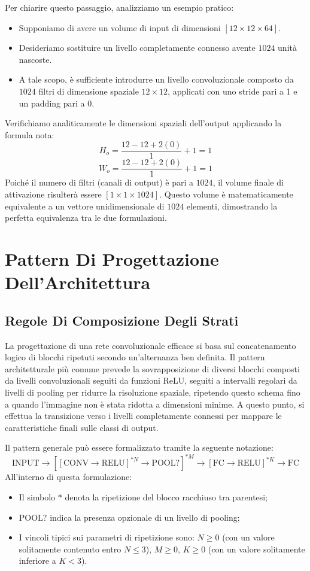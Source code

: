 ﻿\documentclass[11pt, a4paper]{article}
\begin{document}
Per chiarire questo passaggio, analizziamo un esempio pratico:
\begin{itemize}
    \item Supponiamo di avere un volume di input di dimensioni $[12 \times 12 \times 64]$.
    \item Desideriamo sostituire un livello completamente connesso avente $1024$ unità nascoste.
    \item A tale scopo, è sufficiente introdurre un livello convoluzionale composto da $1024$ filtri di dimensione spaziale $12 \times 12$, applicati con uno stride pari a 1 e un padding pari a 0.
\end{itemize}
Verifichiamo analiticamente le dimensioni spaziali dell'output applicando la formula nota:
\[
H_o = \frac{12 - 12 + 2(0)}{1} + 1 = 1
\]
\[
W_o = \frac{12 - 12 + 2(0)}{1} + 1 = 1
\]
Poiché il numero di filtri (canali di output) è pari a $1024$, il volume finale di attivazione risulterà essere $[1 \times 1 \times 1024]$. Questo volume è matematicamente equivalente a un vettore unidimensionale di $1024$ elementi, dimostrando la perfetta equivalenza tra le due formulazioni.

\newpage

\section{Pattern Di Progettazione Dell'Architettura}

\subsection{Regole Di Composizione Degli Strati}

La progettazione di una rete convoluzionale efficace si basa sul concatenamento logico di blocchi ripetuti secondo un'alternanza ben definita. Il pattern architetturale più comune prevede la sovrapposizione di diversi blocchi composti da livelli convoluzionali seguiti da funzioni ReLU, seguiti a intervalli regolari da livelli di pooling per ridurre la risoluzione spaziale, ripetendo questo schema fino a quando l'immagine non è stata ridotta a dimensioni minime. A questo punto, si effettua la transizione verso i livelli completamente connessi per mappare le caratteristiche finali sulle classi di output.

Il pattern generale può essere formalizzato tramite la seguente notazione:
\[
\boxed{\text{INPUT} \rightarrow [[\text{CONV} \rightarrow \text{RELU}]^{*N} \rightarrow \text{POOL?}]^{*M} \rightarrow [\text{FC} \rightarrow \text{RELU}]^{*K} \rightarrow \text{FC}}
\]
All'interno di questa formulazione:
\begin{itemize}
    \item Il simbolo $*$ denota la ripetizione del blocco racchiuso tra parentesi;
    \item $\text{POOL?}$ indica la presenza opzionale di un livello di pooling;
    \item I vincoli tipici sui parametri di ripetizione sono: $N \ge 0$ (con un valore solitamente contenuto entro $N \le 3$), $M \ge 0$, $K \ge 0$ (con un valore solitamente inferiore a $K < 3$).
\end{itemize}
\end{document}

